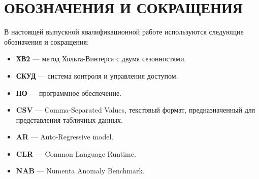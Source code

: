 
\chapter*{\hfill{\centering ОБОЗНАЧЕНИЯ И СОКРАЩЕНИЯ}\hfill}
В настоящей выпускной квалификационной работе используются следующие обозначения и сокращения:

\begin{itemize}
	\item \textbf{ХВ2} --- метод Хольта-Винтерса с двумя сезонностями.
	\item \textbf{СКУД} --- система контроля и управления доступом.
	\item \textbf{ПО} --- программное обеспечение.
	\item \textbf{CSV} --- Comma-Separated Values, текстовый формат, предназначенный для представления табличных данных.
	\item \textbf{AR} --- Auto-Regressive model.
	\item \textbf{CLR} --- Common Language Runtime.
	\item \textbf{NAB} --- Numenta Anomaly Benchmark.
\end{itemize}